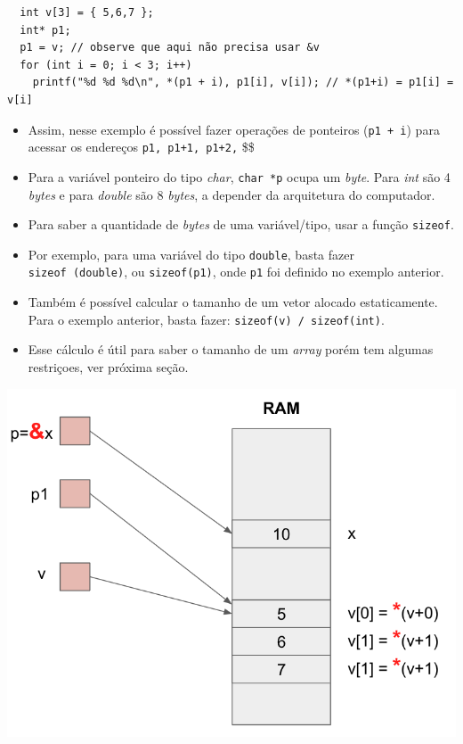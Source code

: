 \documentclass[12pt,a4paper]{article}
\begin{document}
\begin{verbatim}
  int v[3] = { 5,6,7 };
  int* p1;
  p1 = v; // observe que aqui não precisa usar &v
  for (int i = 0; i < 3; i++)
    printf("%d %d %d\n", *(p1 + i), p1[i], v[i]); // *(p1+i) = p1[i] = v[i]
\end{verbatim}

\begin{itemize}
\item
  Assim, nesse exemplo é possível fazer operações de ponteiros
  (\texttt{p1\ +\ i}) para acessar os endereços
  \texttt{p1,\ p1+1,\ p1+2,} \$\cdots \$
\item
  Para a variável ponteiro do tipo \emph{char}, \texttt{char\ *p} ocupa
  um \emph{byte}. Para \emph{int} são 4 \emph{bytes} e para
  \emph{double} são 8 \emph{bytes}, a depender da arquitetura do
  computador.
\item
  Para saber a quantidade de \emph{bytes} de uma variável/tipo, usar a
  função \texttt{sizeof}.
\item
  Por exemplo, para uma variável do tipo \texttt{double}, basta fazer
  \texttt{sizeof\ (double)}, ou \texttt{sizeof(p1)}, onde \texttt{p1}
  foi definido no exemplo anterior.
\item
  Também é possível calcular o tamanho de um vetor alocado
  estaticamente. Para o exemplo anterior, basta fazer:
  \texttt{sizeof(v)\ /\ sizeof(int)}.
\item
  Esse cálculo é útil para saber o tamanho de um \emph{array} porém tem
  algumas restriçoes, ver próxima seção.
\end{itemize}

\includegraphics{"figs/cap8_1.png"}
\end{document}
